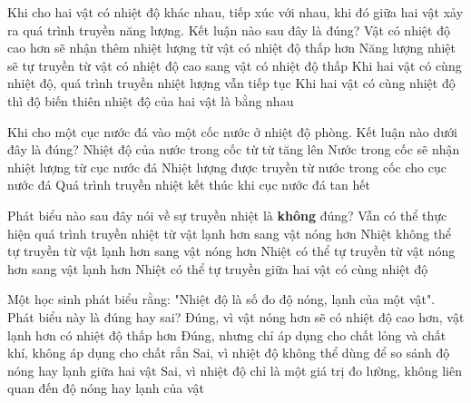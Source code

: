 \begin{ex} 
	Khi cho hai vật có nhiệt độ khác nhau, tiếp xúc với nhau, khi đó giữa hai vật xảy ra quá trình truyền năng lượng. Kết luận nào sau đây là đúng?
	\choice
	{Vật có nhiệt độ cao hơn sẽ nhận thêm nhiệt lượng từ vật có nhiệt độ thấp hơn}
	{\True Năng lượng nhiệt sẽ tự truyền từ vật có nhiệt độ cao sang vật có nhiệt độ thấp}
	{Khi hai vật có cùng nhiệt độ, quá trình truyền nhiệt lượng vẫn tiếp tục}
	{Khi hai vật có cùng nhiệt độ thì độ biến thiên nhiệt độ của hai vật là bằng nhau}
\end{ex}

\begin{ex} 
	Khi cho một cục nước đá vào một cốc nước ở nhiệt độ phòng. Kết luận nào dưới đây là đúng?
	\choice
	{Nhiệt độ của nước trong cốc từ từ tăng lên}
	{Nước trong cốc sẽ nhận nhiệt lượng từ cục nước đá}
	{\True Nhiệt lượng được truyền từ nước trong cốc cho cục nước đá}
	{Quá trình truyền nhiệt kết thúc khi cục nước đá tan hết}
\end{ex}

\begin{ex} 
	Phát biểu nào sau đây nói về sự truyền nhiệt là \textbf{không} đúng?
	\choice
	{Vẫn có thể thực hiện quá trình truyền nhiệt từ vật lạnh hơn sang vật nóng hơn}
	{Nhiệt không thể tự truyền từ vật lạnh hơn sang vật nóng hơn}
	{Nhiệt có thể tự truyền từ vật nóng hơn sang vật lạnh hơn}
	{\True Nhiệt có thể tự truyền giữa hai vật có cùng nhiệt độ}
\end{ex}

\begin{ex} 
	Một học sinh phát biểu rằng: "Nhiệt độ là số đo độ nóng, lạnh của một vật". Phát biểu này là đúng hay sai?
	\choice
	{\True Đúng, vì vật nóng hơn sẽ có nhiệt độ cao hơn, vật lạnh hơn có nhiệt độ thấp hơn}
	{Đúng, nhưng chỉ áp dụng cho chất lỏng và chất khí, không áp dụng cho chất rắn}
	{Sai, vì nhiệt độ không thể dùng để so sánh độ nóng hay lạnh giữa hai vật}
	{Sai, vì nhiệt độ chỉ là một giá trị đo lường, không liên quan đến độ nóng hay lạnh của vật}
\end{ex}

